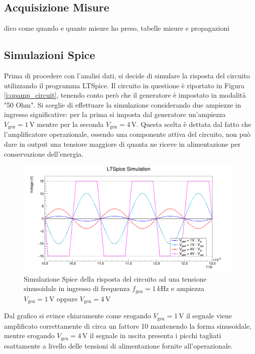 \documentclass[a4paper,11pt]{article}
\begin{document}
\subsection{Acquisizione Misure}
dico come quando e quante misure ho preso, tabelle misure e propagazioni

\subsection{Simulazioni Spice}
Prima di procedere con l'analisi dati, si decide di simulare la risposta del circuito utilizzando il programma LTSpice.
Il circuito in questione è riportato in Figura \ref{i:opamp_circuit}, tenendo conto però che il generatore è impostato
in modalità "50 Ohm". Si sceglie di effettuare la simulazione considerando due ampiezze in ingresso significative: per
la prima si imposta dal generatore un'ampiezza $V_{\text{gen}}=1\,\si{\volt}$ mentre per la seconda
$V_{\text{gen}}=4\,\si{\volt}$. Questa scelta è dettata dal fatto che l'amplificatore operazionale, essendo una
componente attiva del circuito, non può dare in output una tensiore maggiore di quanta ne riceve in alimentazione
per conservazione dell'energia. 

\begin{figure}[H]
	\centering
	\includegraphics[width=\linewidth]{../Plots/Report_Plots/opamp_spice_1V_4V.png}
	\caption{Simulazione Spice della risposta del circuito ad una tensione sinusoidale in ingresso di frequenza
	$f_{\text{gen}}=1\,\si{k\hertz}$ e ampiezza $V_{\text{gen}}=1\,\si{\volt}$ oppure $V_{\text{gen}}=4\,\si{\volt}$}
	\label{i:opamp_simulation}
\end{figure}

\noindent Dal grafico si evince chiaramente come erogando $V_{\text{gen}}=1\,\si{\volt}$ il segnale viene amplificato
correttamente di circa un fattore 10 mantenendo la forma sinusoidale, mentre erogando $V_{\text{gen}}=4\,\si{\volt}$ il
segnale in uscita presenta i picchi tagliati esattamente a livello delle tensioni di alimentazione fornite
all'operazionale.
\end{document}
